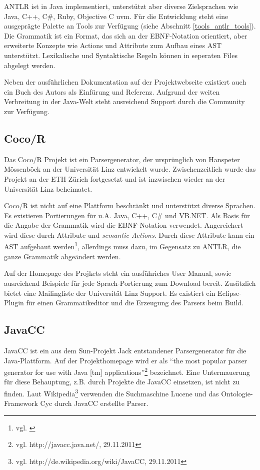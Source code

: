 ANTLR ist in Java implementiert, unterstützt aber diverse Zielsprachen wie Java, C++, C\#, Ruby, Objective C uvm. Für die Entwicklung steht eine ausgeprägte Palette an Tools zur Verfügung (siehe Abschnitt \ref{tools_antlr_tools}). Die Grammatik ist ein Format, das sich an der EBNF-Notation orientiert, aber erweiterte Konzepte wie Actions und Attribute zum Aufbau eines AST unterstützt. Lexikalische und Syntaktische Regeln können in seperaten Files abgelegt werden.

Neben der ausführlichen Dokumentation auf der Projektwebseite existiert auch ein Buch des Autors als Einfürung und Referenz\cite{Parr07}. Aufgrund der weiten Verbreitung in der Java-Welt steht ausreichend Support durch die Community zur Verfügung.



\subsection{Coco/R} 

Das Coco/R Projekt\cite{HaMo90} ist ein Parsergenerator, der ursprünglich von Hans\-peter Mössenböck an der Universität Linz entwickelt wurde. Zwischenzeitlich wurde das Projekt an der ETH Zürich fortgesetzt und ist inzwischen wieder an der Universität Linz beheimatet.

Coco/R ist nicht auf eine Plattform beschränkt und unterstützt diverse Spra\-chen. Es existieren Portierungen für u.A. Java, C++, C\# und VB.NET. Als Basis für die Angabe der Grammatik wird die EBNF-Notation verwendet. Angereichert wird diese durch Attribute und \emph{semantic Actions}. Durch diese Attribute kann ein AST aufgebaut werden\footnote{vgl. \cite{Moes11}}, allerdings muss dazu, im Gegensatz zu ANTLR, die ganze Grammatik abgeändert werden.

Auf der Homepage des Projkets steht ein ausführiches User Manual, sowie ausreichend Beispiele für jede Sprach-Portierung zum Download bereit. Zu\-sätz\-lich bietet eine Mailingliste der Universität Linz Support. Es existiert ein Eclipse-Plugin für einen Grammatikeditor und die Erzeugung des Parsers beim Build.

\subsection{JavaCC}


JavaCC ist ein aus dem Sun-Projekt Jack entstandener Parsergenerator für die Java-Plattform. Auf der Projekthomepage wird er als ``the most popular parser generator for use with Java [tm] applications''\footnote{vgl. http://javacc.java.net/, 29.11.2011} bezeichnet. Eine Untermauerung für diese Behauptung, z.B. durch Projekte die JavaCC einsetzen, ist nicht zu finden. Laut Wikipedia\footnote{vgl. http://de.wikipedia.org/wiki/JavaCC, 29.11.2011} verwenden die Suchmaschine Lucene und das Ontologie-Framework Cyc durch JavaCC erstellte Parser.

